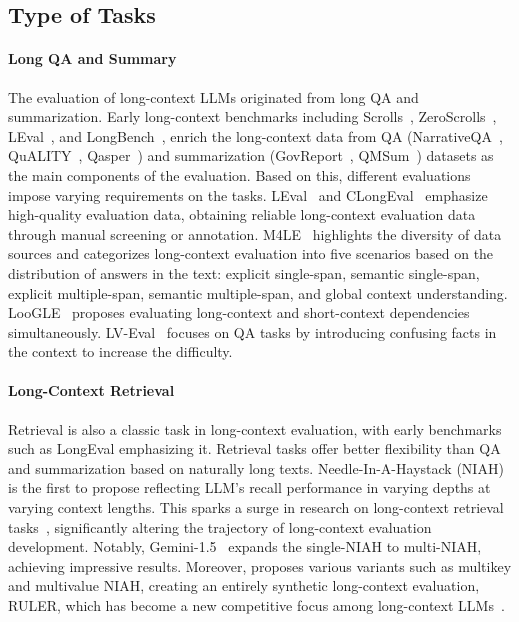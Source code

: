 \subsection{Type of Tasks} 

\paragraph{Long QA and Summary} The evaluation of long-context LLMs originated from long QA and summarization. Early long-context benchmarks including Scrolls~\citep{shaham2022scrolls}, ZeroScrolls~\citep{shaham2023zeroscrolls}, LEval~\citep{an2023eval}, and LongBench~\citep{bai2023longbench}, enrich the long-context data from QA (NarrativeQA~\citep{kovcisky2018narrativeqa}, QuALITY~\citep{pang2022quality}, Qasper~\citep{dasigi2021dataset}) and summarization (GovReport~\citep{huang2021efficient}, QMSum~\citep{zhong2021qmsum}) datasets as the main components of the evaluation. Based on this, different evaluations impose varying requirements on the tasks. LEval~\citep{an2023eval} and CLongEval~\citep{qiu2024clongeval} emphasize high-quality evaluation data, obtaining reliable long-context evaluation data through manual screening or annotation. M4LE~\citep{kwan2023m4le} highlights the diversity of data sources and categorizes long-context evaluation into five scenarios based on the distribution of answers in the text: explicit single-span, semantic single-span, explicit multiple-span, semantic multiple-span, and global context understanding. LooGLE~\citep{li2023loogle} proposes evaluating long-context and short-context dependencies simultaneously. LV-Eval~\citep{yuan2024lv} focuses on QA tasks by introducing confusing facts in the context to increase the difficulty.

\paragraph{Long-Context Retrieval} Retrieval is also a classic task in long-context evaluation, with early benchmarks such as LongEval\cite{longchat} emphasizing it. Retrieval tasks offer better flexibility than QA and summarization based on naturally long texts. Needle-In-A-Haystack (NIAH)~\citep{niah} is the first to propose reflecting LLM's recall performance in varying depths at varying context lengths. This sparks a surge in research on long-context retrieval tasks~\citep{young2024yi,cai2024internlm2,wang2024qwen2}, significantly altering the trajectory of long-context evaluation development. Notably, Gemini-1.5~\citep{reid2024gemini} expands the single-NIAH to multi-NIAH, achieving impressive results. Moreover, \citet{hsieh2024ruler} proposes various variants such as multikey and multivalue NIAH, creating an entirely synthetic long-context evaluation, RULER, which has become a new competitive focus among long-context LLMs~\citep{team2024jamba,liu2024retrievalattention,LFM}.

